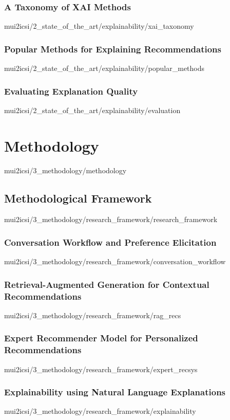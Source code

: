 \documentclass[english,epsbased,copyright,final,printable,covers,extendedindex,firstnumbered,tfm,gnuplot,loc,loe,lof,lot]{tfgtfmthesisuam}
\begin{document}
      \subsection{A Taxonomy of XAI Methods\label{SS:XAITAXONOMY}}{mui2icsi/2_state_of_the_art/explainability/xai_taxonomy}
      \subsection{Popular Methods for Explaining Recommendations\label{SS:POPMETHODS}}{mui2icsi/2_state_of_the_art/explainability/popular_methods}
      \subsection{Evaluating Explanation Quality\label{SS:EVALEXPLAIN}}{mui2icsi/2_state_of_the_art/explainability/evaluation}

  \chapter{Methodology\label{CAP:METHODOLOGY}}{mui2icsi/3_methodology/methodology}
    \section{Methodological Framework\label{SEC:RESEARCHFW}}{mui2icsi/3_methodology/research_framework/research_framework}
      \subsection{Conversation Workflow and Preference Elicitation\label{SS:CONVPREF}}{mui2icsi/3_methodology/research_framework/conversation_workflow}
      \subsection{Retrieval-Augmented Generation for Contextual Recommendations\label{SS:RAGRECS}}{mui2icsi/3_methodology/research_framework/rag_recs}
      \subsection{Expert Recommender Model for Personalized Recommendations\label{SS:EXPERTRECSYS}}{mui2icsi/3_methodology/research_framework/expert_recsys}
      \subsection{Explainability using Natural Language Explanations\label{SS:EXPLAINNLE}}{mui2icsi/3_methodology/research_framework/explainability}
\end{document}
